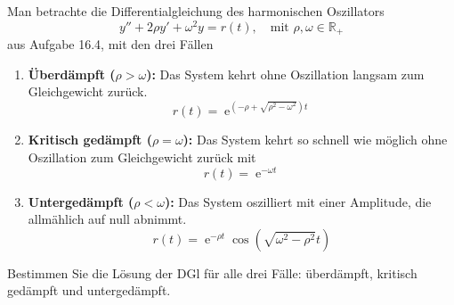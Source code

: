 {
Man betrachte die Differentialgleichung des harmonischen Oszillators
\[
y'' + 2\rho y' + \omega^2 y = r(t), \quad \text{mit } \rho, \omega \in \mathbb R_+
\]
aus Aufgabe 16.4, %
mit den drei Fällen
\begin{enumerate}
  \item \textbf{Überdämpft (\( \rho > \omega \)):} Das System kehrt ohne Oszillation langsam zum Gleichgewicht zurück.
  $$
  r(t) = \operatorname{e}^{(-\rho + \sqrt{\rho^2 - \omega^2})t}
  $$
  \item \textbf{Kritisch gedämpft (\( \rho = \omega \)):} Das System kehrt so schnell wie möglich ohne Oszillation zum Gleichgewicht zurück mit
  $$
  r(t) = \operatorname{e}^{-\omega t}
  $$
  \item \textbf{Untergedämpft (\( \rho < \omega \)):} Das System oszilliert mit einer Amplitude, die allmählich auf null abnimmt.
  $$
  r(t) = \operatorname{e}^{-\rho t} \cos(\sqrt{\omega^2 - \rho^2}t)
  $$
\end{enumerate}
Bestimmen Sie die Lösung der DGl für alle drei Fälle: überdämpft, kritisch gedämpft und untergedämpft.

}


